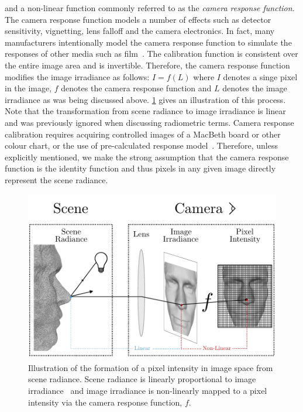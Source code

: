 and a non-linear function commonly referred to as the
\textit{camera response function}. The camera response function models a number
of effects such as detector sensitivity, vignetting, lens falloff and the
camera electronics. In fact, many manufacturers intentionally model
the camera response function to simulate the responses of other media
such as film~\cite{grossberg2003space}. The calibration function is consistent
over the entire image area and is invertible. Therefore, the camera response
function modifies the image irradiance as follows: $I = f(L)$ where $I$ denotes
a singe pixel in the image, $f$ denotes the camera response function and $L$
denotes the image irradiance as was being discussed above.
\cref{fig:bg_sfs_scene_to_intensity} gives an illustration of this process. Note
that the transformation from scene radiance to image irradiance is
linear~\cite{horn1979calculating} and was previously ignored when discussing
radiometric terms. Camera response calibration requires acquiring controlled
images of a MacBeth board or other colour chart, or the use of pre-calculated
response model~\cite{grossberg2003space}. Therefore, unless explicitly
mentioned, we make the strong assumption that the camera response function
is the identity function and thus pixels in any given image directly
represent the scene radiance.
\begin{figure}[t]
	\centering
	\includegraphics[width=\columnwidth]{background/images/scene_radiance_to_pixel}
	\caption{Illustration of the formation of a pixel intensity in image space
	         from scene radiance. Scene radiance is linearly proportional
	         to image irradiance~\cite{horn1979calculating} and image irradiance
	         is non-linearly mapped to a pixel intensity via the camera
	         response function, $f$.}
\label{fig:bg_sfs_scene_to_intensity}
\end{figure}

